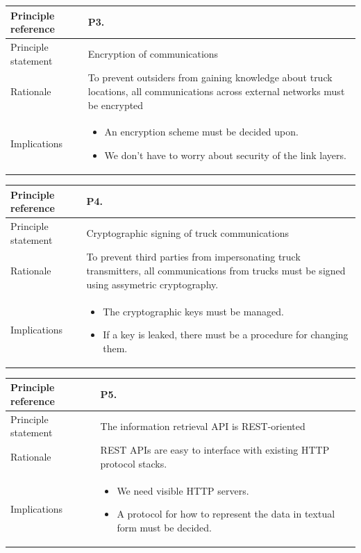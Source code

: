 \documentclass[a4paper,11pt]{report}
\begin{document}
\begin{center}
\begin{tabular}[h!]{| >{\columncolor{gray}}p{} | p{} |}
    \hline
    Principle reference & P3. \\
    \hline
    Principle statement & Encryption of communications \\
    \hline
    Rationale & To prevent outsiders from gaining knowledge about truck locations, all communications across external networks must be encrypted \\
    \hline
    Implications & \begin{itemize}
      \item An encryption scheme must be decided upon.
      \item We don't have to worry about security of the link layers.
      \end{itemize}
        \\
    \hline
  \end{tabular}
\end{center}
\begin{center}
\begin{tabular}[h!]{| >{\columncolor{gray}}p{} | p{} |}
    \hline
    Principle reference & P4. \\
    \hline
    Principle statement & Cryptographic signing of truck communications \\
    \hline
    Rationale & To prevent third parties from impersonating truck transmitters, all communications from trucks must be signed using assymetric cryptography. \\
    \hline
    Implications & \begin{itemize}
    \item The cryptographic keys must be managed.
    \item If a key is leaked, there must be a procedure for changing them.
    \end{itemize}
        \\
    \hline
  \end{tabular}
\end{center}
\begin{center}
\begin{tabular}[h!]{| >{\columncolor{gray}}p{} | p{} |}
    \hline
    Principle reference & P5. \\
    \hline
    Principle statement & The information retrieval API is REST-oriented \\
    \hline
    Rationale & REST APIs are easy to interface with existing HTTP protocol stacks. \\
    \hline
    Implications & \begin{itemize}
    \item We need visible HTTP servers.
    \item A protocol for how to represent the data in textual form
      must be decided.
    \end{itemize}
        \\
    \hline
  \end{tabular}
\end{center}
\end{document}
